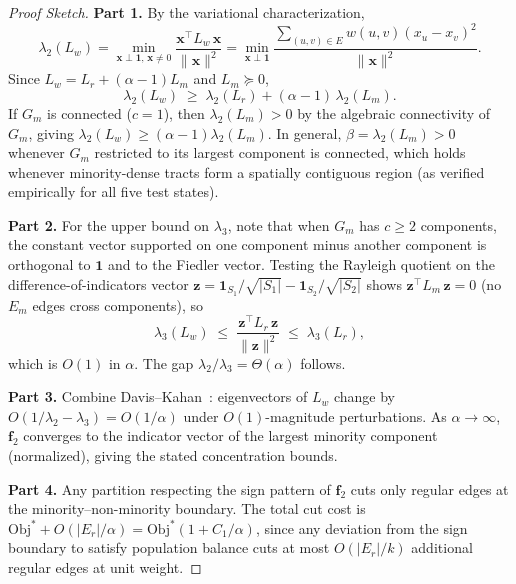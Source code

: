 \begin{proof}[Proof Sketch]
\textbf{Part 1.} By the variational characterization,
\[
    \lambda_2(L_w) = \min_{\mathbf{x} \perp \mathbf{1},\, \mathbf{x}\neq 0} \frac{\mathbf{x}^\top L_w\, \mathbf{x}}{\|\mathbf{x}\|^2}
    = \min_{\mathbf{x} \perp \mathbf{1}} \frac{\displaystyle\sum_{(u,v)\in E} w(u,v)(x_u - x_v)^2}{\|\mathbf{x}\|^2}.
\]
Since $L_w = L_r + (\alpha-1)L_m$ and $L_m \succeq 0$,
\[
    \lambda_2(L_w) \;\geq\; \lambda_2(L_r) + (\alpha - 1)\,\lambda_2(L_m).
\]
If $G_m$ is connected ($c=1$), then $\lambda_2(L_m) > 0$ by the algebraic connectivity of $G_m$, giving $\lambda_2(L_w) \geq (\alpha-1)\lambda_2(L_m)$. In general, $\beta = \lambda_2(L_m) > 0$ whenever $G_m$ restricted to its largest component is connected, which holds whenever minority-dense tracts form a spatially contiguous region (as verified empirically for all five test states).

\textbf{Part 2.} For the upper bound on $\lambda_3$, note that when $G_m$ has $c \geq 2$ components, the constant vector supported on one component minus another component is orthogonal to $\mathbf{1}$ and to the Fiedler vector. Testing the Rayleigh quotient on the difference-of-indicators vector $\mathbf{z} = \mathbf{1}_{S_1}/\sqrt{|S_1|} - \mathbf{1}_{S_2}/\sqrt{|S_2|}$ shows $\mathbf{z}^\top L_m\, \mathbf{z} = 0$ (no $E_m$ edges cross components), so
\[
    \lambda_3(L_w) \;\leq\; \frac{\mathbf{z}^\top L_r\, \mathbf{z}}{\|\mathbf{z}\|^2} \;\leq\; \lambda_3(L_r),
\]
which is $O(1)$ in $\alpha$. The gap $\lambda_2/\lambda_3 = \Theta(\alpha)$ follows.

\textbf{Part 3.} Combine Davis--Kahan~\cite{davis1970rotation}: eigenvectors of $L_w$ change by $O(1/\lambda_2 - \lambda_3) = O(1/\alpha)$ under $O(1)$-magnitude perturbations. As $\alpha \to \infty$, $\mathbf{f}_2$ converges to the indicator vector of the largest minority component (normalized), giving the stated concentration bounds.

\textbf{Part 4.} Any partition respecting the sign pattern of $\mathbf{f}_2$ cuts only regular edges at the minority--non-minority boundary. The total cut cost is $\mathrm{Obj}^* + O(|E_r|/\alpha) = \mathrm{Obj}^*(1 + C_1/\alpha)$, since any deviation from the sign boundary to satisfy population balance cuts at most $O(|E_r|/k)$ additional regular edges at unit weight.
\end{proof}

